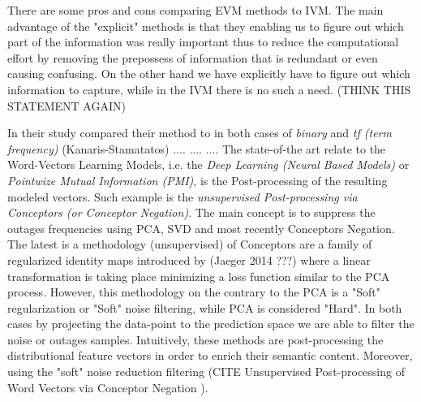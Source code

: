 There are some pros and cons comparing EVM methods to IVM. The main advantage of the "explicit" methods is that they enabling us to figure out which part of the information was really important thus to reduce the computational effort by removing the prepossess of information that is redundant or even causing confusing. On the other hand we have explicitly have to figure out which information to capture, while in the IVM there is no such a need. (THINK THIS STATEMENT AGAIN)

In their study compared their method to in both cases of \textit{binary} and \textit{tf (term frequency)} (Kanaris-Stamatatos)
....
....
....
The state-of-the art relate to the Word-Vectors Learning Models, i.e. the \textit{Deep Learning (Neural Based Models)} or \textit{Pointwize Mutual Information (PMI)}, is the Post-processing of the resulting modeled vectors. Such example is the \textit{unsupervised Post-processing via Conceptors (or Conceptor Negation)}. The main concept is to suppress the outages frequencies using PCA, SVD and most recently Conceptors Negation. The latest is a methodology (unsupervised) of Conceptors are a family of regularized identity maps introduced by (Jaeger 2014 ???) where a linear transformation is taking place minimizing a loss function similar to the PCA process. However, this methodology on the contrary to the PCA is a "Soft" regularization or "Soft" noise filtering, while PCA is considered "Hard". In both cases by projecting the data-point to the prediction space we are able to filter the noise or outages samples. Intuitively, these methods are post-processing the distributional feature vectors in order to enrich their semantic content. Moreover, using the "soft" noise reduction filtering (CITE Unsupervised Post-processing of Word Vectors via Conceptor Negation ).


